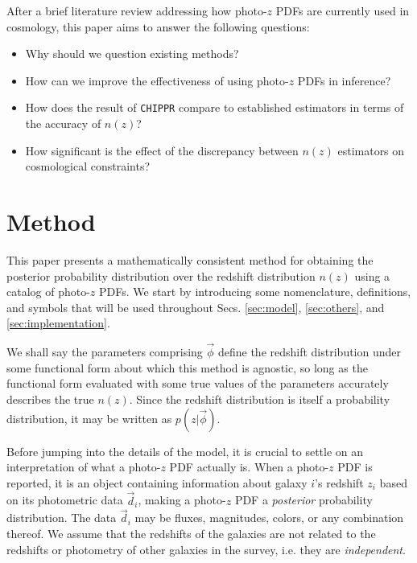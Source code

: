 \documentclass[iop]{emulateapj}
\newcommand{\chippr}{\texttt{CHIPPR} }
\begin{document}
After a brief literature review addressing how photo-$z$ PDFs are currently used in cosmology, this paper aims to answer the following questions:

\begin{itemize}
	\item Why should we question existing methods?
	\item How can we improve the effectiveness of using photo-$z$ PDFs in inference?
	\item How does the result of \chippr compare to established estimators in terms of the accuracy of $n(z)$?
	\item How significant is the effect of the discrepancy between $n(z)$ estimators on cosmological constraints?
\end{itemize}

\section{Method}
\label{sec:method}

This paper presents a mathematically consistent method for obtaining the posterior probability distribution over the redshift distribution $n(z)$ using a catalog of photo-$z$ PDFs.  We start by introducing some nomenclature, definitions, and symbols that will be used throughout Secs. \ref{sec:model}, \ref{sec:others}, and \ref{sec:implementation}.

We shall say the parameters comprising $\vec{\phi}$ define the redshift distribution under some functional form about which this method is agnostic, so long as the functional form evaluated with some true values of the parameters accurately describes the true $n(z)$.  Since the redshift distribution is itself a probability distribution, it may be written as $p(z | \vec{\phi})$.

Before jumping into the details of the model, it is crucial to settle on an interpretation of what a photo-$z$ PDF actually is.  When a photo-$z$ PDF is reported, it is an object containing information about galaxy $i$'s redshift $z_{i}$ based on its photometric data $\vec{d}_{i}$, making a photo-$z$ PDF a \textit{posterior} probability distribution.  The data $\vec{d}_{i}$ may be fluxes, magnitudes, colors, or any combination thereof.  We assume that the redshifts of the galaxies are not related to the redshifts or photometry of other galaxies in the survey, i.e. they are \textit{independent}.
\end{document}
